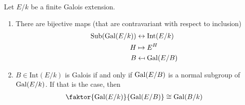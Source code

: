 \begin{thm}
  Let $E/k$ be a finite Galois extension.
  \begin{enumerate}
    \item There are bijective maps (that are contravariant with respect to inclusion)
      \begin{align*}
        \text{Sub}(\operatorname{Gal}(E/k)) &\leftrightarrow \text{Int}(E/k)\\
        H &\mapsto  E^{H}\\
        B &\mapsfrom \operatorname{Gal}(E/B)
      \end{align*}
    \item $B \in \text{Int}(E/k)$ is Galois if and only if $\operatorname{Gal}(E/B)$ is a normal subgroup of $\operatorname{Gal}(E/k)$. 
      If that is the case, then
      \begin{align*}
        \faktor{\Gal(E/k)}{\Gal(E/B)} \iso \Gal(B/k)
      \end{align*}
  \end{enumerate}
\end{thm}

